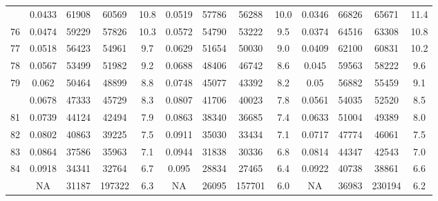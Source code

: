 \documentclass[
  14pt,
]{article}
\begin{document}
\begin{longtable}[t]{lcccccccccccc}
\addlinespace
75 & 0.0433 & 61908 & 60569 & 10.8 & 0.0519 & 57786 & 56288 & 10.0 & 0.0346 & 66826 & 65671 & 11.4\\
76 & 0.0474 & 59229 & 57826 & 10.3 & 0.0572 & 54790 & 53222 & 9.5 & 0.0374 & 64516 & 63308 & 10.8\\
77 & 0.0518 & 56423 & 54961 & 9.7 & 0.0629 & 51654 & 50030 & 9.0 & 0.0409 & 62100 & 60831 & 10.2\\
78 & 0.0567 & 53499 & 51982 & 9.2 & 0.0688 & 48406 & 46742 & 8.6 & 0.045 & 59563 & 58222 & 9.6\\
79 & 0.062 & 50464 & 48899 & 8.8 & 0.0748 & 45077 & 43392 & 8.2 & 0.05 & 56882 & 55459 & 9.1\\
\addlinespace
80 & 0.0678 & 47333 & 45729 & 8.3 & 0.0807 & 41706 & 40023 & 7.8 & 0.0561 & 54035 & 52520 & 8.5\\
81 & 0.0739 & 44124 & 42494 & 7.9 & 0.0863 & 38340 & 36685 & 7.4 & 0.0633 & 51004 & 49389 & 8.0\\
82 & 0.0802 & 40863 & 39225 & 7.5 & 0.0911 & 35030 & 33434 & 7.1 & 0.0717 & 47774 & 46061 & 7.5\\
83 & 0.0864 & 37586 & 35963 & 7.1 & 0.0944 & 31838 & 30336 & 6.8 & 0.0814 & 44347 & 42543 & 7.0\\
84 & 0.0918 & 34341 & 32764 & 6.7 & 0.095 & 28834 & 27465 & 6.4 & 0.0922 & 40738 & 38861 & 6.6\\
\addlinespace
85 & NA & 31187 & 197322 & 6.3 & NA & 26095 & 157701 & 6.0 & NA & 36983 & 230194 & 6.2\\*
\end{longtable}
\end{document}
